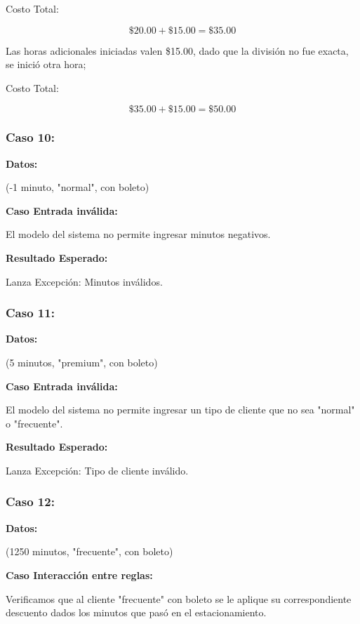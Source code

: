 \documentclass[11pt,letterpaper]{article}
\begin{document}
Costo Total:

\[
   \text{\$}20.00 + \text{\$}15.00 = \text{\$}35.00
\]

Las horas adicionales iniciadas valen \$15.00, dado que la división no fue exacta, se inició otra hora;



Costo Total:

\[
   \text{\$}35.00 + \text{\$}15.00 = \text{\$}50.00
\]


\subsubsection{Caso 10:}
\label{sec:orgc644b4d}

\textbf{Datos:}

(-1 minuto, "normal", con boleto)

\textbf{Caso Entrada inválida:}

El modelo del sistema no permite ingresar minutos negativos.

\textbf{Resultado Esperado:}

Lanza Excepción: Minutos inválidos.


\subsubsection{Caso 11:}
\label{sec:org28afb21}

\textbf{Datos:}

(5 minutos, "premium", con boleto)

\textbf{Caso Entrada inválida:}

El modelo del sistema no permite ingresar un tipo de cliente que no sea "normal" o "frecuente".

\textbf{Resultado Esperado:}

Lanza Excepción: Tipo de cliente inválido.


\subsubsection{Caso 12:}
\label{sec:org1d4f272}

\textbf{Datos:}

(1250 minutos, "frecuente", con boleto)

\textbf{Caso Interacción entre reglas:}

Verificamos que al cliente "frecuente" con boleto se le aplique su correspondiente descuento dados los minutos que pasó en el estacionamiento.
\end{document}
